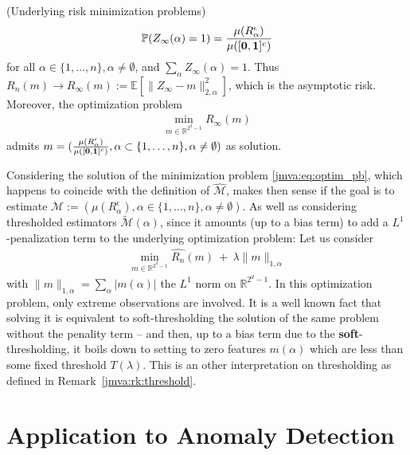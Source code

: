 \begin{remark}{(\sc Underlying risk minimization problems)}
$$\mathbb{P}(Z_\infty(\alpha) = 1) = \frac{\mu(R_\alpha^\epsilon)}{\mu([\mathbf 0, \mathbf 1]^c)}$$ for all $\alpha \in \{1,\ldots,n\}, \alpha \neq \emptyset $, and $\sum_\alpha Z_\infty(\alpha) = 1$.
Thus $R_n(m)\to R_\infty(m):=\mathbb{E}[\|Z_\infty - m \|_{2,\alpha}^2]$, which is the asymptotic risk. Moreover, the optimization problem
\begin{align*}
\min_{m \in \mathbb{R}^{2^d-1}} R_\infty(m)  
\end{align*}
admits $m = (\frac{\mu(R_\alpha^\epsilon)}{\mu([\mathbf 0, \mathbf 1]^c)}, \alpha \subset \{1,\ldots,n\}, \alpha \neq \emptyset)$ as solution.

Considering the solution of the minimization problem \eqref{jmva:eq:optim_pb}, which happens to coincide with the definition of $\widehat{\mathcal{M}}$, makes then sense if the goal is 
to estimate $\mathcal{M}:= (\mu(R_\alpha^\epsilon), \alpha \in \{1,\ldots,n\}, \alpha \neq \emptyset)$.
As well as
considering thresholded estimators $\widetilde{\mathcal{M}}(\alpha)$, since it amounts (up to a bias term) to add a $L^1$-penalization term to the underlying optimization problem:
Let us consider
\begin{align*}
\min_{m \in \mathbb{R}^{2^d-1}} \widehat{R_n}(m) ~+~ \lambda \|m\|_{1, \alpha}
\end{align*}
with $\|m\|_{1,\alpha} = \sum_{\alpha} |m(\alpha)|$ the $L^1$ norm on $\mathbb{R}^{2^d-1}$. In this optimization problem, only extreme observations are involved. It is a well known fact that solving it is equivalent to soft-thresholding the solution of the same problem without the penality term -- and then, up to a bias term due to the \textbf{soft}-thresholding, it boils down to setting to zero features $m(\alpha)$ which are less than some fixed threshold $T(\lambda)$. This is an other interpretation on thresholding as defined in Remark~\ref{jmva:rk:threshold}.
\end{remark}

\section{Application to Anomaly Detection }
\label{jmva:sec:appliAD}
